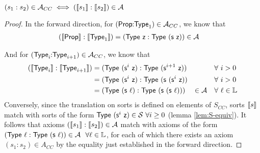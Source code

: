 \documentclass[10pt]{article}
\begin{document}
\begin{lemma}
  \label{lem:A-equiv}
  $(s_1:s_2) \in \mathcal{A}_{CC} \iff (\llbracket s_1 \rrbracket:\llbracket s_2 \rrbracket) \in \mathcal{A}$
  \begin{proof}
    In the forward direction, for $(\textsf{Prop}\hspace{-3pt}:\hspace{-3pt}\textsf{Type}_1) \in \mathcal{A}_{CC}$, we know that
    \begin{align*}
      (\llbracket \textsf{Prop} \rrbracket:\llbracket \textsf{Type}_1 \rrbracket) &= (\textsf{Type}\ \textsf{z}:\textsf{Type}\ (\textsf{s}\ \textsf{z})) \in \mathcal{A}
    \end{align*}

    And for $(\textsf{Type}_i\hspace{-3pt}:\hspace{-3pt}\textsf{Type}_{i+1}) \in \mathcal{A}_{CC}$, we know that
    \begin{align*}
      (\rew{\Type_i}:\rew{\Type_{i+1}}) &= (\Type\ (\s^i\ \z):\Type\ (\s^{i+1}\ \z)) &&\forall\ i>0\\
                                        &= (\Type\ (\s^i\ \z):\Type\ (\s\ (\s^i\ \z)) &&\forall\ i>0\\
                                        &= (\Type\ (\s\ \l):\Type\ (\s\ (\s\ \l))) &\in \A \quad &\forall\ \l \in \mathbb{L} 
    \end{align*}
    Conversely, since the translation on sorts is defined on elements of $S_{CC}$, sorts $\llbracket s \rrbracket$ match with sorts of the form $\textsf{Type}\ (\textsf{s}^i\ \textsf{z})\in \mathcal{S}\ \forall i \ge 0$ (lemma \ref{lem:S-equiv}). It follows that axioms $(\llbracket s_1 \rrbracket:\llbracket s_2 \rrbracket) \in \mathcal{A}$ match with axioms of the form $(\Type\ \l:\Type\ (\s\ \l)) \in \A ~~ \forall \l \in \mathbb{L}$, for each of which there exists an axiom $(s_1:s_2) \in A_{CC}$ by the equality just established in the forward direction.
  \end{proof}
\end{lemma}
\end{document}
